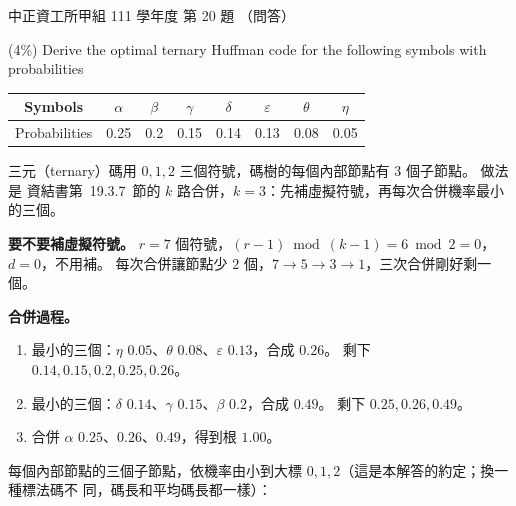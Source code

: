 \begin{pastexam}[label={px:ccu-111-swa-12}]{中正資工所甲組 111 學年度 第 20 題}
（問答）

(4\%) Derive the optimal ternary Huffman code for the following symbols with probabilities
\begin{center}
\begin{tabular}{|c|c|c|c|c|c|c|c|}
\hline
Symbols & $\alpha$ & $\beta$ & $\gamma$ & $\delta$ & $\varepsilon$ & $\theta$ & $\eta$\\ \hline
Probabilities & 0.25 & 0.2 & 0.15 & 0.14 & 0.13 & 0.08 & 0.05\\ \hline
\end{tabular}
\end{center}
\end{pastexam}

\begin{pastsoln}
三元（ternary）碼用 $0, 1, 2$ 三個符號，碼樹的每個內部節點有 $3$ 個子節點。 做法是
資結書第~19.3.7~節的 $k$ 路合併，$k = 3$：先補虛擬符號，再每次合併機率最小的三個。

\textbf{要不要補虛擬符號。} $r = 7$ 個符號，$(r - 1) \bmod (k - 1) = 6 \bmod 2 = 0$，
$d = 0$，不用補。 每次合併讓節點少 $2$ 個，$7 \to 5 \to 3 \to 1$，三次合併剛好剩一個。

\textbf{合併過程。}
\begin{enumerate}
\item 最小的三個：$\eta$ $0.05$、$\theta$ $0.08$、$\varepsilon$ $0.13$，合成 $0.26$。 剩下
$0.14, 0.15, 0.2, 0.25, 0.26$。
\item 最小的三個：$\delta$ $0.14$、$\gamma$ $0.15$、$\beta$ $0.2$，合成 $0.49$。 剩下
$0.25, 0.26, 0.49$。
\item 合併 $\alpha$ $0.25$、$0.26$、$0.49$，得到根 $1.00$。
\end{enumerate}

每個內部節點的三個子節點，依機率由小到大標 $0, 1, 2$（這是本解答的約定；換一種標法碼不
同，碼長和平均碼長都一樣）：


\end{pastsoln}
